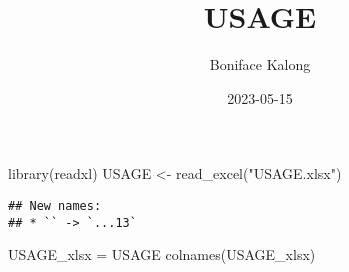 \documentclass[
]{article}
\title{USAGE}
\author{Boniface Kalong}
\date{2023-05-15}
\newenvironment{Shaded}{\begin{snugshade}}{\end{snugshade}}
\newcommand{\FunctionTok}[1]{\textcolor[rgb]{0.00,0.00,0.00}{#1}}
\newcommand{\NormalTok}[1]{#1}
\newcommand{\OtherTok}[1]{\textcolor[rgb]{0.56,0.35,0.01}{#1}}
\newcommand{\StringTok}[1]{\textcolor[rgb]{0.31,0.60,0.02}{#1}}
\begin{document}
\maketitle

\begin{Shaded}
\begin{Highlighting}[]
\FunctionTok{library}\NormalTok{(readxl)}
\NormalTok{USAGE }\OtherTok{\textless{}{-}} \FunctionTok{read\_excel}\NormalTok{(}\StringTok{"USAGE.xlsx"}\NormalTok{)}
\end{Highlighting}
\end{Shaded}

\begin{verbatim}
## New names:
## * `` -> `...13`
\end{verbatim}

\begin{Shaded}
\begin{Highlighting}[]
\NormalTok{USAGE\_xlsx }\OtherTok{=}\NormalTok{ USAGE}
\FunctionTok{colnames}\NormalTok{(USAGE\_xlsx)}
\end{Highlighting}
\end{Shaded}
\end{document}
